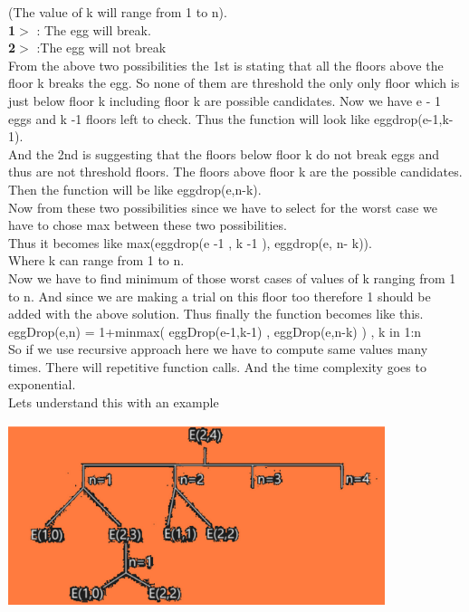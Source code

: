 \documentclass[12pt]{book}
\begin{document}
(The value of k will range from 1 to n).\\
\textbf{1$>$} : The egg will break.\\
\textbf{2$>$} :The egg will not break\\
\newline
From the above two possibilities the 1st is stating that all the floors above the floor k breaks the egg. So none of them are threshold the only only floor which is just below floor k including floor k are possible candidates. Now we have e - 1 eggs and k -1 floors left to check. Thus the function will look like eggdrop(e-1,k-1).\\
\newline
And the 2nd is suggesting that the floors below floor k do not break eggs and thus are not threshold floors. The floors above floor k are the possible candidates. Then the function will be like eggdrop(e,n-k).\\
\newline
Now from these two possibilities since we have to select for the worst case we have to chose max between these two possibilities.\\
\newline
Thus it becomes like max(eggdrop(e -1 , k -1 ), eggdrop(e, n- k)).\\
Where k can range from 1 to n.\\
Now we have to find minimum of those worst cases of values of k ranging from 1 to n. And since we are making a trial on this floor too therefore 1 should be added with the above solution. Thus finally the function becomes like this.\\
\newline
eggDrop(e,n) = 1+min{max( eggDrop(e-1,k-1) , eggDrop(e,n-k) ) , k in 1:n}\\
\newline
So if we use recursive approach here we have to compute same values many times. There will repetitive function calls. And the time complexity goes to exponential.\\
\newline
Lets understand this with an example\\
\begin{center}
    \includegraphics[width =11cm]{qESBw3q.png}    
\end{center}
\end{document}
